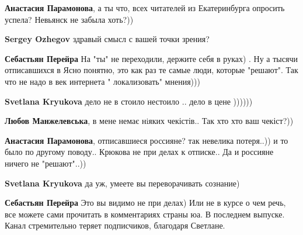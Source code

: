 \begin{itemize}
\begin{itemize}
\textbf{Анастасия Парамонова}, а ты что, всех читателей из Екатеринбурга опросить успела? Невьянск не забыла хоть?))


 
\textbf{Sergey Ozhegov} здравый смысл с вашей точки зрения?

 
\textbf{Себастьян Перейра} На "ты" не переходили, держите себя в руках) .
Ну а тысячи отписавшихся в Ясно понятно, это как раз те самые люди, которые "решают".
Так что не надо в век интернета " локализовать" мнения)))

 
\textbf{Svetlana Kryukova} дело не в стоило нестоило .. дело в цене ))))))

 
\textbf{Любов Манжелевська}, в мене немає нiяких чекістів.. Так хто хто ваш чекіст?))

 
\textbf{Анастасия Парамонова}, отписавшиеся россияне? так невелика потеря..)) и то было по другому поводу.. Крюкова не при делах к отписке.. Да и россияне ничего не "решают"..))

 
\textbf{Svetlana Kryukova} да уж, умеете вы переворачивать сознание)

 
\textbf{Себастьян Перейра} Это вы видимо не при делах) Или не в курсе о чем речь, все можете сами прочитать в комментариях страны юа. В последнем выпуске. Канал стремительно теряет подписчиков, благодаря Светлане.


\end{itemize}
\end{itemize}
